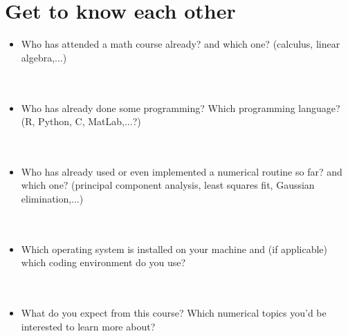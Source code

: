 \documentclass{article}
\begin{document}
\section*{Get to know each other}
\begin{itemize}
	\item Who has attended a math course already? and which one? (calculus, linear algebra,...)\\~\\~\\
		\item Who has already done some programming? Which programming language? (R, Python, C, MatLab,...?)\\~\\~\\
	\item Who has already used or even implemented a numerical routine so far? and which one? (principal component analysis, least squares fit, Gaussian elimination,...)\\~\\~\\
	\item Which operating system is installed on your machine and (if applicable) which coding environment do you use?\\~\\~\\
	\item What do you expect from this course? Which numerical topics you'd be interested to learn more about?\\~\\~\\
\end{itemize}
\end{document}
